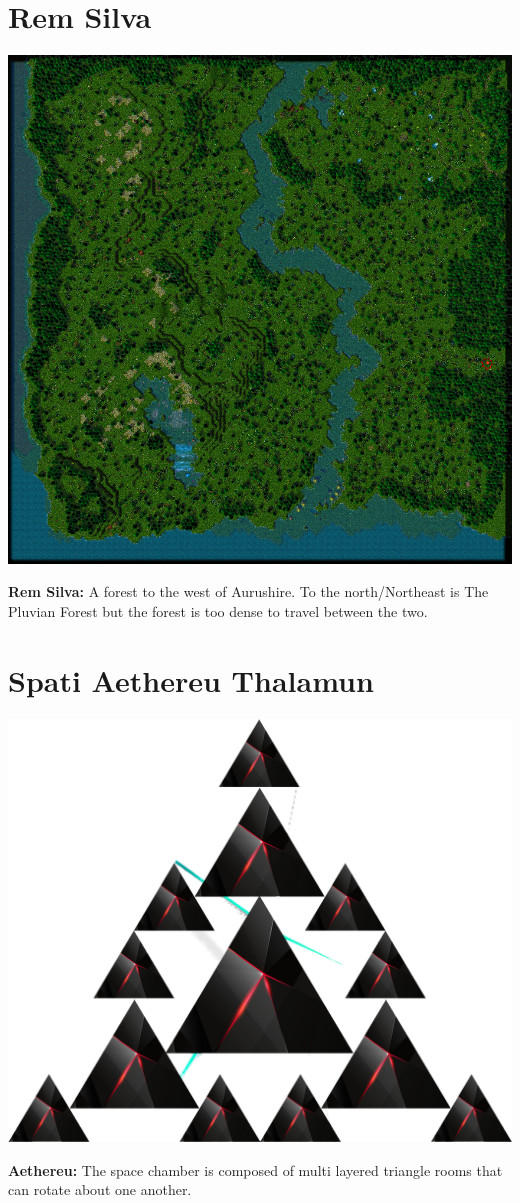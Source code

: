 \section{Rem Silva}
\begin{center}
	\includegraphics[width=\linewidth]{img/maps/RemSilva.png}
	
	{\textbf{Rem Silva:} A forest to the west of Aurushire. To the north/Northeast is The Pluvian Forest but the forest is too dense to travel between the two.}
\end{center}

\section{Spati Aethereu Thalamun}
\begin{center}
	\includegraphics[width=0.5\linewidth]{img/maps/Aethereu.png}	
	
	{\textbf{Aethereu:} The space chamber is composed of multi layered triangle rooms that can rotate about one another.}
\end{center}

